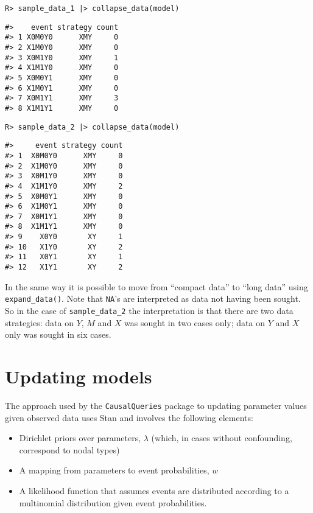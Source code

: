 \documentclass[
  11pt,
  article]{jss}
\providecommand{\tightlist}{%
  \setlength{\itemsep}{0pt}\setlength{\parskip}{0pt}}\usepackage{longtable,booktabs,array}
\begin{document}
\begin{verbatim}
R> sample_data_1 |> collapse_data(model)
\end{verbatim}

\begin{verbatim}
#>    event strategy count
#> 1 X0M0Y0      XMY     0
#> 2 X1M0Y0      XMY     0
#> 3 X0M1Y0      XMY     1
#> 4 X1M1Y0      XMY     0
#> 5 X0M0Y1      XMY     0
#> 6 X1M0Y1      XMY     0
#> 7 X0M1Y1      XMY     3
#> 8 X1M1Y1      XMY     0
\end{verbatim}

\begin{verbatim}
R> sample_data_2 |> collapse_data(model)
\end{verbatim}

\begin{verbatim}
#>     event strategy count
#> 1  X0M0Y0      XMY     0
#> 2  X1M0Y0      XMY     0
#> 3  X0M1Y0      XMY     0
#> 4  X1M1Y0      XMY     2
#> 5  X0M0Y1      XMY     0
#> 6  X1M0Y1      XMY     0
#> 7  X0M1Y1      XMY     0
#> 8  X1M1Y1      XMY     0
#> 9    X0Y0       XY     1
#> 10   X1Y0       XY     2
#> 11   X0Y1       XY     1
#> 12   X1Y1       XY     2
\end{verbatim}

In the same way it is possible to move from ``compact data'' to ``long
data'' using \texttt{expand\_data()}. Note that \texttt{NA}'s are
interpreted as data not having been sought. So in the case of
\texttt{sample\_data\_2} the interpretation is that there are two data
strategies: data on \(Y\), \(M\) and \(X\) was sought in two cases only;
data on \(Y\) and \(X\) only was sought in six cases.

\hypertarget{sec-update}{%
\section{Updating models}\label{sec-update}}

The approach used by the \texttt{CausalQueries} package to updating
parameter values given observed data uses Stan \citep{carpenter2017stan}
and involves the following elements:

\begin{itemize}
\tightlist
\item
  Dirichlet priors over parameters, \(\lambda\) (which, in cases without
  confounding, correspond to nodal types)
\item
  A mapping from parameters to event probabilities, \(w\)
\item
  A likelihood function that assumes events are distributed according to
  a multinomial distribution given event probabilities.
\end{itemize}
\end{document}
